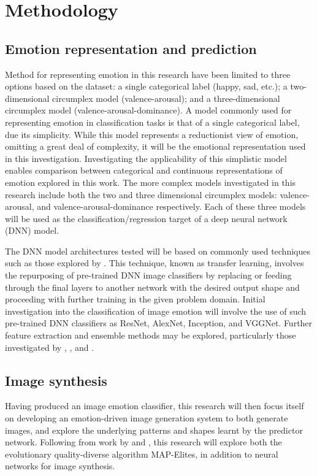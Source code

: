 \documentclass{article}
\begin{document}
\section{Methodology}

\subsection{Emotion representation and prediction}
Method for representing emotion in this research have been limited to three options based on the dataset: a single categorical label (happy, sad, etc.); a two-dimensional circumplex model (valence-arousal); and a three-dimensional circumplex model (valence-arousal-dominance).
A model commonly used for representing emotion in classification tasks is that of a single categorical label, due its simplicity.
While this model represents a reductionist view of emotion, omitting a great deal of complexity, it will be the emotional representation used in this investigation.
Investigating the applicability of this simplistic model enables comparison between categorical and continuous representations of emotion explored in this work.
The more complex models investigated in this research include both the two and three dimensional circumplex models: valence-arousal, and valence-arousal-dominance respectively.
Each of these three models will be used as the classification/regression target of a deep neural network (DNN) model.

The DNN model architectures tested will be based on commonly used techniques such as those explored by \citet{kim2018building, chen2015learning}.
This technique, known as transfer learning, involves the repurposing of pre-trained DNN image classifiers by replacing or feeding through the final layers to another network with the desired output shape and proceeding with further training in the given problem domain.
Initial investigation into the classification of image emotion will involve the use of such pre-trained DNN classifiers as ResNet, AlexNet, Inception, and VGGNet.
Further feature extraction and ensemble methods may be explored, particularly those investigated by \citet{kim2018building}, \citet{chen2015learning}, and \citet{chen2015learning}.

\subsection{Image synthesis}
Having produced an image emotion classifier, this research will then focus itself on developing an emotion-driven image generation system to both generate images, and explore the underlying patterns and shapes learnt by the predictor network.
Following from work by \citet{nguyen2015innovation} and \citet{tan2017artgan}, this research will explore both the evolutionary quality-diverse algorithm MAP-Elites, in addition to neural networks for image synthesis.
\end{document}

